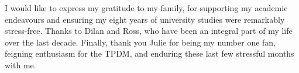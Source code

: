 I would like to express my gratitude to my family, for supporting my academic endeavours and ensuring my eight years of university studies were remarkably stress-free. Thanks to Dilan and Ross, who have been an integral part of my life over the last decade. Finally, thank you Julie for being my number one fan, feigning enthusiasm for the TPDM, and enduring these last few stressful months with me.


\newpage

\setcounter{page}{7} %

\tableofcontents
\newpage
\listoffigures
\newpage
\listoftables

\newpage
{} %